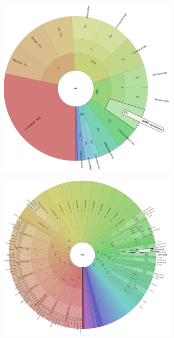 \begin{figure}[H]
\begin{subfigure}[b]{0.43\textwidth}
        \includegraphics[width=1\textwidth]{figures/results/real/krona/krona-sf-sSRR12596175.png}
        \label{fig:results:real:krona-sf-b}
        \end{subfigure}
        \hfill
        \begin{subfigure}[b]{0.45\textwidth}
        \includegraphics[width=1\textwidth]{figures/results/real/krona/krona-sf-all.png}
        \label{fig:results:real:krona-sf-c}
        \end{subfigure}
    \end{figure}
    
